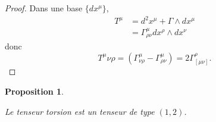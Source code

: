 \documentclass[a4paper,11pt]{report}
\theoremstyle{definition}
\theoremstyle{plain}
\newtheorem{prop}[thm]{Proposition}
\theoremstyle{definition}
\theoremstyle{remark}
\begin{document}
                \begin{proof}
                    Dans une base $\{dx^\mu\}$,
                    \begin{align}
                        T^\mu &= d^2x^\mu + \Gamma\wedge dx^\mu\\
                        &= \Gamma^\mu_{\rho\nu}dx^\rho\wedge dx^\nu
                    \end{align}
                    donc
                    \begin{equation}
                        T^\mu{\nu\rho} = \left( \Gamma^\mu_{\nu\rho}-\Gamma^\mu_{\rho\nu} \right) = 2\Gamma^\rho_{[\mu\nu]}.
                    \end{equation}
                \end{proof}
                
                \begin{prop}\begin{leftbar}
                    Le tenseur torsion est un tenseur de type $(1,2)$.
                \end{leftbar}\end{prop}
                
\end{document}
